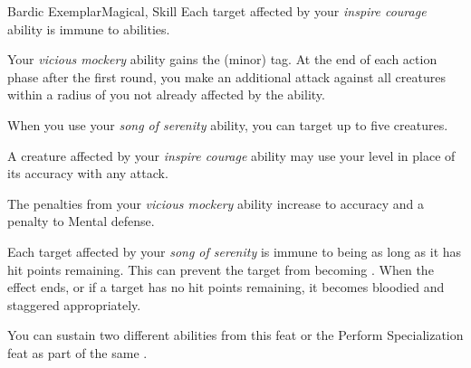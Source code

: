 \begin{feat}{Bardic Exemplar}{Magical, Skill}
         Each target affected by your \textit{inspire courage} ability is immune to  abilities.

         Your \textit{vicious mockery} ability gains the  (minor) tag.
        At the end of each action phase after the first round, you make an additional attack against all creatures within a \areahuge radius of you not already affected by the ability.

         When you use your \textit{song of serenity} ability, you can target up to five creatures.

         A creature affected by your \textit{inspire courage} ability may use your level in place of its accuracy with any attack.

         The penalties from your \textit{vicious mockery} ability increase to  accuracy and a  penalty to Mental defense.

         Each target affected by your \textit{song of serenity} is immune to being  as long as it has hit points remaining.
        This can prevent the target from becoming .
        When the effect ends, or if a target has no hit points remaining, it becomes bloodied and staggered appropriately.

         You can sustain two different  abilities from this feat or the Perform Specialization feat as part of the same .
    \end{feat}

